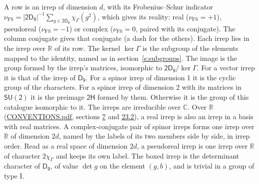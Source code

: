 \documentclass[10pt,a4paper]{article}
\numberwithin{equation}{section}
\newcommand{\grp}[1]{\mathsf{#1}}
\newcommand{\irchar}[1]{\chi_{#1}}
\newcommand{\fsind}{\nu_{\mathrm{FS}}}
\begin{document}
\leavevmode\label{n:index.frobenius}\label{n:head.irrep}\label{n:head.reality}A row is an irrep of dimension $d$, with its Frobenius--Schur indicator $\fsind = |\grp{2D_{9}}|^{-1}\allowbreak\sum_{g\in\grp{2D_{9}}}\irchar{\Gamma}(g^2)$, which gives its reality: real ($\fsind = +1$), pseudoreal ($\fsind = -1$) or complex ($\fsind = 0$, paired with its conjugate). \label{n:head.conjugate}The column conjugate gives that conjugate (a dash for the others). \label{n:head.over.real}Each irrep lies in the irrep over $\mathbb{R}$ of its row. \label{n:head.kernel}The kernel $\ker\Gamma$ is the subgroup of the elements mapped to the identity, named as in section~\ref{s:subgroups}. \label{n:head.image}The image is the group formed by the irrep's matrices, isomorphic to $\grp{2D_{9}}/\ker\Gamma$. For a vector irrep it is that of the irrep of \href{../../../rotation/data/pdf/D9.pdf}{$\grp{D_{9}}$}. For a spinor irrep of dimension 1 it is the cyclic group of the characters. For a spinor irrep of dimension 2 with its matrices in $\grp{SU(2)}$ it is the preimage $\grp{2H}$ formed by them. Otherwise it is the group of this catalogue isomorphic to it. The irreps are irreducible over $\mathbb{C}$. Over $\mathbb{R}$ (\href{../../CONVENTIONS.pdf}{CONVENTIONS.pdf}, sections \href{../../../rotation/CONVENTIONS.pdf\#conv.7}{7} and \href{../../CONVENTIONS.pdf\#conv.23.2}{23.2}), a real irrep is also an irrep in a basis with real matrices. A complex-conjugate pair of spinor irreps forms one irrep over $\mathbb{R}$ of dimension $2d$, named by the labels of its two members side by side, in irrep order. Read as a real space of dimension $2d$, a pseudoreal irrep is one irrep over $\mathbb{R}$ of character $2\irchar{\Gamma}$ and keeps its own label. \label{n:mark.determinant}The boxed irrep is the determinant character of \href{../../../rotation/data/pdf/D9.pdf}{$\grp{D_{9}}$}, of value $\det g$ on the element $(g, b)$, and is trivial in a group of type I.
\setlength{\emergencystretch}{2em}\par\setlength{\emergencystretch}{0pt}
\end{document}
